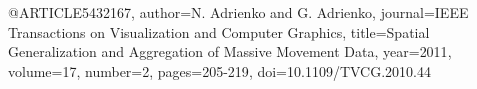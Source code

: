 @ARTICLE{5432167,
  author={N. {Adrienko} and G. {Adrienko}},
  journal={IEEE Transactions on Visualization and Computer Graphics}, 
  title={Spatial Generalization and Aggregation of Massive Movement Data}, 
  year={2011},
  volume={17},
  number={2},
  pages={205-219},
  doi={10.1109/TVCG.2010.44}}